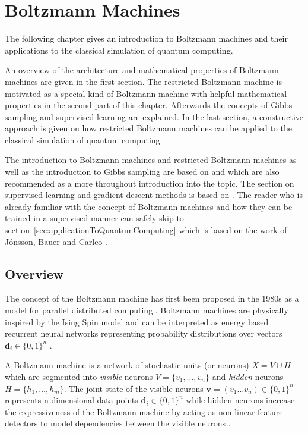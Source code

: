 \chapter{Boltzmann Machines}
The following chapter gives an introduction to Boltzmann machines and their applications to the classical 
simulation of quantum computing.

An overview of the architecture and mathematical properties of Boltzmann machines are given in 
the first section. The restricted Boltzmann machine is motivated as a special kind of 
Boltzmann machine with helpful mathematical properties in the second part of this 
chapter. Afterwards the concepts of Gibbs sampling and supervised learning are explained.
In the last section, a constructive approach is given on how restricted Boltzmann machines 
can be applied to the classical simulation of quantum computing.

The introduction to Boltzmann machines and restricted Boltzmann machines as well as the introduction 
to Gibbs sampling are based on \cite{montufar2018restricted} and 
\cite{fischer2012introduction} which are also recommended as a more throughout introduction 
into the topic. The section on supervised learning and gradient descent methods is based on \cite{ruder2016overview}. The 
reader who is already familiar with the concept of Boltzmann machines and how they can be trained in a supervised 
manner can safely skip
to section~\ref{sec:applicationToQuantumComputing} which is based on the work of J\'{o}nsson, Bauer and Carleo \cite{jnsson2018neuralnetwork}.

\section{Overview}
The concept of the Boltzmann machine has first been proposed in the 1980s as a
model for parallel distributed computing \cite{hinton1983analyzing}. Boltzmann machines are physically inspired by the Ising Spin model 
and can be interpreted as energy based recurrent neural networks representing probability distributions
over vectors $\bm{d}_i \in \{0,1\}^n$ \cite{ackley1985learning}.

A Boltzmann machine is a network of stochastic units (or neurons) $X=V \cup H$ which are segmented into
\textit{visible} neurons $V=\{v_1, \dots, v_n\}$ and \textit{hidden} neurons $H=\{h_1, \dots, h_m\}$.
The joint state of the visible neurons $\bm{v} = (v_1\dots v_n) \in \{0,1\}^n$ represents n-dimensional data
points $\bm{d}_i \in \{0,1\}^n$ while hidden neurons increase the expressiveness of the Boltzmann machine by acting as non-linear feature 
detectors to model dependencies between the visible neurons \cite{hinton2010boltzmann}.

